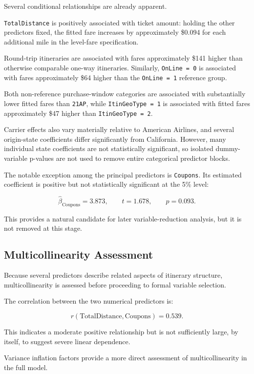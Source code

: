 \documentclass[11pt,a4paper]{article}
\begin{document}
Several conditional relationships are already apparent.

\texttt{TotalDistance} is positively associated with ticket amount: holding the other predictors fixed, the fitted fare increases by approximately \$0.094 for each additional mile in the level-fare specification.

Round-trip itineraries are associated with fares approximately \$141 higher than otherwise comparable one-way itineraries. Similarly, \texttt{OnLine = 0} is associated with fares approximately \$64 higher than the \texttt{OnLine = 1} reference group.

Both non-reference purchase-window categories are associated with substantially lower fitted fares than \texttt{21AP}, while \texttt{ItinGeoType = 1} is associated with fitted fares approximately \$47 higher than \texttt{ItinGeoType = 2}.

Carrier effects also vary materially relative to American Airlines, and several origin-state coefficients differ significantly from California. However, many individual state coefficients are not statistically significant, so isolated dummy-variable p-values are not used to remove entire categorical predictor blocks.

The notable exception among the principal predictors is \texttt{Coupons}. Its estimated coefficient is positive but not statistically significant at the 5\% level:

\[
\hat{\beta}_{\text{Coupons}} = 3.873,
\qquad
t = 1.678,
\qquad
p = 0.093.
\]

This provides a natural candidate for later variable-reduction analysis, but it is not removed at this stage.

\subsection{Multicollinearity Assessment}

Because several predictors describe related aspects of itinerary structure, multicollinearity is assessed before proceeding to formal variable selection.

The correlation between the two numerical predictors is:

\[
r(\text{TotalDistance},\text{Coupons}) = 0.539.
\]

This indicates a moderate positive relationship but is not sufficiently large, by itself, to suggest severe linear dependence.

Variance inflation factors provide a more direct assessment of multicollinearity in the full model.
\end{document}
